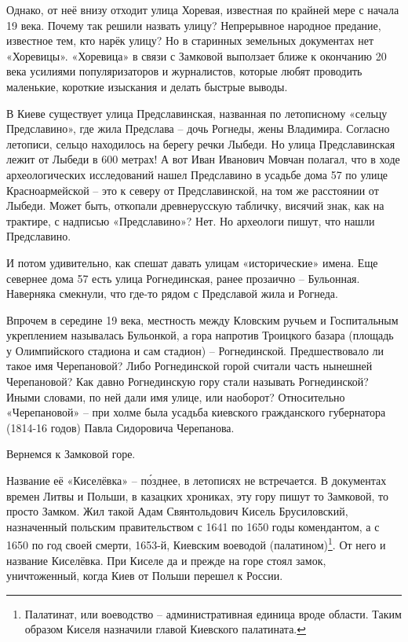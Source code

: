 Однако, от неё внизу отходит улица Хоревая, известная по крайней мере с начала 19 века. Почему так решили назвать улицу? Непрерывное народное предание, известное тем, кто нарёк улицу? Но в старинных земельных документах нет «Хоревицы». «Хоревица» в связи с Замковой выползает ближе к окончанию 20 века усилиями популяризаторов и журналистов, которые любят проводить маленькие, короткие изыскания и делать быстрые выводы.

В Киеве существует улица Предславинская, названная по летописному «сельцу Предславино», где жила Предслава – дочь Рогнеды, жены Владимира. Согласно летописи, сельцо находилось на берегу речки Лыбеди. Но улица Предславинская лежит от Лыбеди в 600 метрах! А вот Иван Иванович Мовчан полагал, что в ходе археологических исследований нашел Предславино в усадьбе дома 57 по улице Красноармейской – это к северу от Предславинской, на том же расстоянии от Лыбеди. Может быть, откопали древнерусскую табличку, висячий знак, как на трактире, с надписью «Предславино»? Нет. Но археологи пишут, что нашли Предславино.

И потом удивительно, как спешат давать улицам «исторические» имена. Еще севернее дома 57 есть улица Рогнединская, ранее прозаично – Бульонная. Наверняка смекнули, что где-то рядом с Предславой жила и Рогнеда. 

Впрочем в середине 19 века, местность между Кловским ручьем и Госпитальным укреплением называлась Бульонкой, а гора напротив Троицкого базара (площадь у Олимпийского стадиона и сам стадион) – Рогнединской. Предшествовало ли такое имя Черепановой? Либо Рогнединской горой считали часть нынешней Черепановой? Как давно Рогнединскую гору стали называть Рогнединской? Иными словами, по ней дали имя улице, или наоборот? Относительно «Черепановой» – при холме была усадьба киевского гражданского губернатора (1814-16 годов) Павла Сидоровича Черепанова.

Вернемся к Замковой горе. 

Название её «Киселёвка» – п\'озднее, в летописях не встречается. В документах времен Литвы и Польши, в казацких хрониках, эту гору пишут то Замковой, то просто Замком. Жил такой Адам Свянтольдович Кисель Брусиловский, назначенный польским правительством с 1641 по 1650 годы комендантом, а с 1650 по год своей смерти, 1653-й, Киевским воеводой (палатином)\footnote{Палатинат, или воеводство – административная единица вроде области. Таким образом Киселя назначили главой Киевского палатината.}. От него и название Киселёвка. При Киселе да и прежде на горе стоял замок, уничтоженный, когда Киев от Польши перешел к России.

